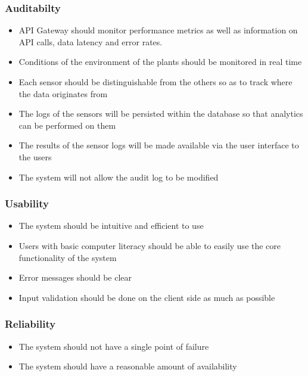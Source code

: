\documentclass{article}
\begin{document}
\subsubsection{Auditabilty}
	\begin{itemize}
		\item API Gateway should monitor performance metrics as well as information on API calls, data latency and error rates.
		\item Conditions of the environment of the plants should be monitored in real time
		\item Each sensor should be distinguishable from the others so as to track where the data originates from
		\item The logs of the sensors will be persisted within the database so that analytics can be performed on them
		\item The results of the sensor logs will be made available via the user interface to the users
		\item The system will not allow the audit log to be modified
	\end{itemize}
\subsubsection{Usability}
	\begin{itemize}
		\item The system should be intuitive and efficient to use
		\item Users with basic computer literacy should be able to easily use the core functionality of the system
		\item Error messages should be clear
		\item Input validation should be done on the client side as much as possible
	\end{itemize}
\subsubsection{Reliability}
	\begin{itemize}
		\item The system should not have a single point of failure
		\item The system should have a reasonable amount of availability
	\end{itemize}
\end{document}
